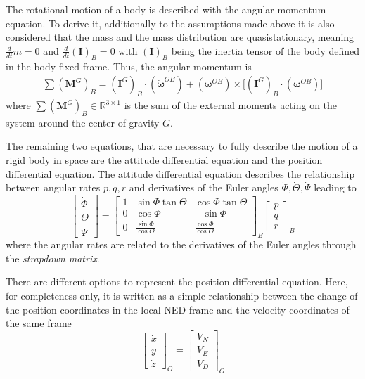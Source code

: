 \documentclass[11pt, a4paper, twoside]{report}
\begin{document}
The rotational motion of a body is described with the angular momentum equation. To derive it, additionally to the assumptions made above it is also considered that the mass and the mass distribution are quasistationary, meaning $\frac{d}{dt}m=0$ and $\frac{d}{dt}(\bm{I})_B=0$ with $(\bm{I})_B$ being the inertia tensor of the body defined in the body-fixed frame. Thus, the angular momentum is
\begin{equation}
	\begin{split}
		\sum (\bm{M}^G)_B = (\bm{I}^G)_B \cdot (\bm{\dot{\omega}}^{OB}) + (\bm{\omega}^{OB}) \times \Big[(\bm{I}^G)_B \cdot (\bm{\omega}^{OB})\Big]
		\label{eq:ang_momentum}
	\end{split}
\end{equation}
where $\sum (\bm{M}^G)_B \in \mathbb{R}^{3 \times 1}$ is the sum of the external moments acting on the system around the center of gravity $G$.

The remaining two equations, that are necessary to fully describe the motion of a rigid body in space are the attitude differential equation and the position differential equation. The attitude differential equation describes the relationship between angular rates $p, q, r$ and derivatives of the Euler angles $\dot{\Phi}, \dot{\Theta}, \dot{\Psi}$ leading to
\begin{equation}
	\begin{bmatrix}
		\dot{\Phi}\\
		\dot{\Theta}\\
		\dot{\Psi}
	\end{bmatrix} =
	\begin{bmatrix}
    	1 & \sin\Phi\tan\Theta & \cos\Phi\tan\Theta \\
    	0 & \cos\Phi & -\sin\Phi \\
    	0 & \frac{\sin\Phi}{\cos\Theta} & \frac{\cos\Phi}{\cos\Theta}
    \end{bmatrix}_B
    \begin{bmatrix}
		p\\
		q\\
		r
	\end{bmatrix}_B
	\label{eq:attitude_diff_eq}
\end{equation}
where the angular rates are related to the derivatives of the Euler angles through the \textit{strapdown matrix}.

There are different options to represent the position differential equation. Here, for completeness only, it is written as a simple relationship between the change of the position coordinates in the local \acrshort{NED} frame and the velocity coordinates of the same frame
\begin{equation}
	\begin{bmatrix}
		\dot{x}\\
		\dot{y}\\
		\dot{z}
	\end{bmatrix}_O =
	\begin{bmatrix}
		V_N\\
		V_E\\
		V_D
	\end{bmatrix}_O
	\label{eq:position_diff_eq}
\end{equation}
\end{document}
